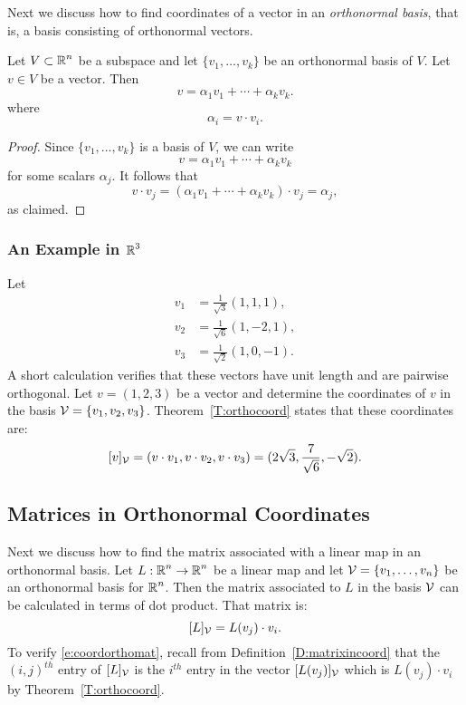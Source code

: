\documentclass{ximera}
\begin{document}
Next we discuss how to find coordinates of a vector in an
{\em orthonormal basis},
that is, a basis consisting of orthonormal vectors.

\begin{theorem}  \label{T:orthocoord}
Let $V\subset\mbox{$\mathbb{R}$}^n$ be a subspace and
let $\{v_1,\ldots,v_k\}$ be an
orthonormal basis of $V$.  Let $v\in V$ be a vector.   Then
\[
v = \alpha_1v_1 + \cdots + \alpha_kv_k.
\]
where
\[
\alpha_i = v\cdot v_i.
\]
\end{theorem}

\begin{proof}  Since $\{v_1,\ldots,v_k\}$ is a basis of $V$, we can write
\[
v = \alpha_1v_1 + \cdots + \alpha_kv_k
\]
for some scalars $\alpha_j$.  It follows that
\[
v\cdot v_j = (\alpha_1v_1 + \cdots + \alpha_kv_k)\cdot v_j = \alpha_j,
\]
as claimed.   \end{proof}

\subsubsection{An Example in $\mbox{$\mathbb{R}$}^3$}

Let
\begin{align*}
  v_1 &= \frac{1}{\sqrt{3}}(1,1,1), \\
  v_2 &= \frac{1}{\sqrt{6}}(1,-2,1), \\
  v_3 &= \frac{1}{\sqrt{2}}(1,0,-1).
\end{align*}
A short calculation verifies that these vectors have
unit length and are pairwise orthogonal.  Let $v=(1,2,3)$ be a vector
and determine the coordinates of $v$ in the basis ${\cal V}=\{v_1,v_2,v_3\}$.
Theorem~\ref{T:orthocoord} states that these coordinates are:
\[
[v]_{\cal V} = (v\cdot v_1, v\cdot v_2, v\cdot v_3)
= (2\sqrt{3},\frac{7}{\sqrt{6}},-\sqrt{2}).
\]


\subsection*{Matrices in Orthonormal Coordinates}

Next we discuss how to find the matrix associated with a linear map in an
orthonormal basis.  Let $L:\mbox{$\mathbb{R}$}^n\to\mbox{$\mathbb{R}$}^n$ be a linear map and let
${\cal V} = \{v_1,\ldots,v_n\}$ be an orthonormal basis for $\mbox{$\mathbb{R}$}^n$.  Then
the matrix associated to $L$ in the basis ${\cal V}$ can be calculated 
in terms of dot product.  That matrix is:
\begin{equation}  \label{e:coordorthomat}
[L]_{\cal V} = L(v_j)\cdot v_i.
\end{equation}
To verify \eqref{e:coordorthomat}, recall from Definition~\ref{D:matrixincoord} that 
the $(i,j)^{th}$ entry of $[L]_{\cal V}$ is
the $i^{th}$ entry in the vector $[L(v_j)]_{\cal V}$ which is
$L(v_j)\cdot v_i$ by Theorem~\ref{T:orthocoord}.
\end{document}
